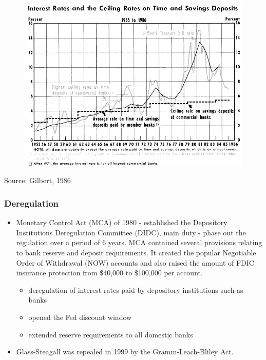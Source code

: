 \documentclass[11pt]{beamer}
\begin{document}
\begin{frame}
\begin{figure}
\includegraphics[width=\textwidth]{Interestceiling2.png}
\end{figure}
\tiny{Source: Gilbert, 1986}

\end{frame}



\begin{frame}
\frametitle{Deregulation}

\begin{itemize}
\item Monetary Control Act (MCA) of 1980 - established the Depository Institutions Deregulation Committee (DIDC), main duty - phase out the regulation over a period of 6 years. MCA contained several provisions relating to bank reserve and deposit requirements. It created the popular Negotiable Order of Withdrawal (NOW) accounts and also raised the amount of FDIC insurance protection from $\$$40,000 to $\$$100,000 per account.

\begin{itemize}
\item deregulation of interest rates paid by depository institutions such as banks
\item opened the Fed discount window
\item extended reserve requirements to all domestic banks
\end{itemize}


\item Glass-Steagall was repealed in 1999 by the Gramm-Leach-Bliley Act.
\end{itemize}


\end{frame}
\end{document}
